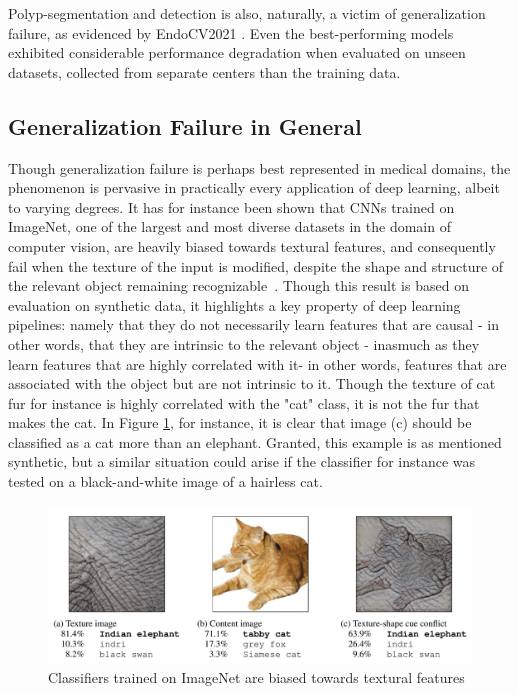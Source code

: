 	Polyp-segmentation and detection is also, naturally, a victim of generalization failure, as evidenced by EndoCV2021 \cite{endocv2021}. Even the best-performing models exhibited considerable performance degradation when evaluated on unseen datasets, collected from separate centers than the training data. 
	 
	\subsection{Generalization Failure in General}
	Though generalization failure is perhaps best represented in medical domains, the phenomenon is pervasive in practically every application of deep learning, albeit to varying degrees. It has for instance been shown that CNNs trained on ImageNet, one of the largest and most diverse datasets in the domain of computer vision, are heavily biased towards textural features, and consequently fail when the texture of the input is modified, despite the shape and structure of the relevant object remaining recognizable~\cite{texturebias}. Though this result is based on evaluation on synthetic data, it highlights a key property of deep learning pipelines: namely that they do not necessarily learn features that are causal - in other words, that they are intrinsic to the relevant object - inasmuch as they learn features that are highly correlated with it- in other words, features that are associated with the object but are not intrinsic to it. Though the texture of cat fur for instance is highly correlated with the "cat" class, it is not the fur that makes the cat. In Figure \ref{cat_elephant}, for instance, it is clear that image (c) should be classified as a cat more than an elephant. Granted, this example is as mentioned synthetic, but a similar situation could arise if the classifier for instance was tested on a black-and-white image of a hairless cat. 
	\begin{figure}[ht]
		\includegraphics[width=\linewidth]{illustrations/cat_elephant.png}
		\caption{Classifiers trained on ImageNet are biased towards textural features}
		\label{cat_elephant}
	\end{figure}
	
